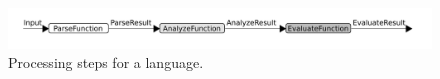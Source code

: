 \section{}
\label{sec:function-comp}

\begin{figure}[h]
  \includegraphics[width=\textwidth]{unit-flow}
  \caption{Processing steps for a language.}
  \label{fig:unit-flow}
\end{figure}
